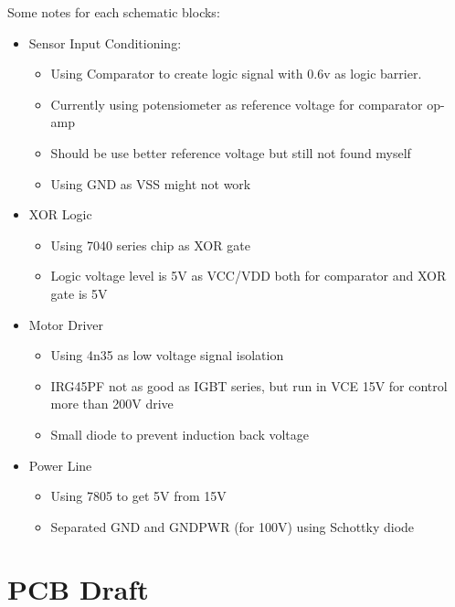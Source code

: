 \documentclass[a4paper,12pt,oneside,pdflatex,italian,final]{article}
\begin{document}
    Some notes for each schematic blocks:
    \begin{itemize}
    	\item Sensor Input Conditioning:
    	\begin{itemize}
    		\item Using Comparator to create logic signal with 0.6v as logic barrier.
    		\item Currently using potensiometer as reference voltage for comparator op-amp
    		\item Should be use better reference voltage but still not found myself
    		\item Using GND as VSS might not work
    	\end{itemize}
    	
    	\item XOR Logic
    	\begin{itemize}
    		\item Using 7040 series chip as XOR gate
    		\item Logic voltage level is 5V as VCC/VDD both for comparator and XOR gate is 5V
    	\end{itemize}
    	
    	\item Motor Driver
    	\begin{itemize}
    		\item Using 4n35 as low voltage signal isolation
    		\item IRG45PF not as good as IGBT series, but run in VCE 15V for control more than 200V drive
    		\item Small diode to prevent induction back voltage
    	\end{itemize}
    	
    	\item Power Line
    	\begin{itemize}
    		\item Using 7805 to get 5V from 15V
    		\item Separated GND and GNDPWR (for 100V) using Schottky diode 
    	\end{itemize}
    \end{itemize}
    
    \newpage
    \section{PCB Draft}
    
\end{document}
